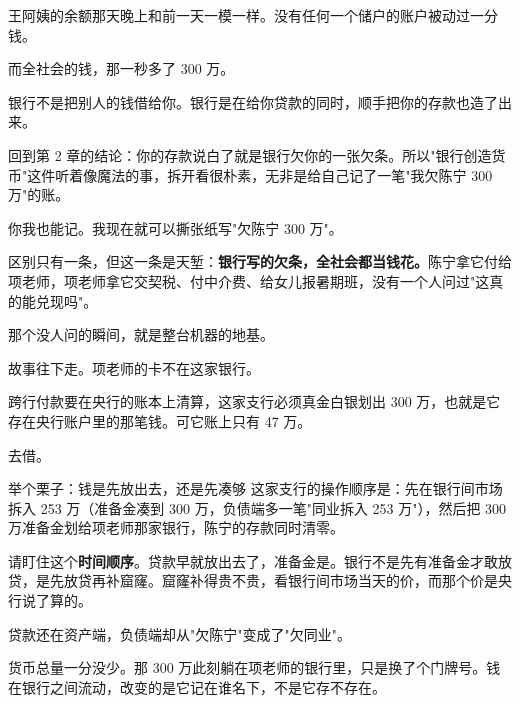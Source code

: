 王阿姨的余额那天晚上和前一天一模一样。没有任何一个储户的账户被动过一分钱。

而全社会的钱，那一秒多了 300 万。

\begin{pullquote}{}
银行不是把别人的钱借给你。银行是在给你贷款的同时，顺手把你的存款也造了出来。
\end{pullquote}

回到第 2 章的结论：你的存款说白了就是银行欠你的一张欠条。所以"银行创造货币"这件听着像魔法的事，拆开看很朴素，无非是给自己记了一笔"我欠陈宁 300 万"的账。

你我也能记。我现在就可以撕张纸写"欠陈宁 300 万"。

区别只有一条，但这一条是天堑：\textbf{银行写的欠条，全社会都当钱花。}陈宁拿它付给项老师，项老师拿它交契税、付中介费、给女儿报暑期班，没有一个人问过"这真的能兑现吗"。

那个没人问的瞬间，就是整台机器的地基。

故事往下走。项老师的卡不在这家银行。

跨行付款要在央行的账本上清算，这家支行必须真金白银划出 300 万，也就是它存在央行账户里的那笔钱。可它账上只有 47 万。

去借。

\begin{egbox}{举个栗子：钱是先放出去，还是先凑够}
这家支行的操作顺序是：先在银行间市场拆入 253 万（准备金凑到 300 万，负债端多一笔"同业拆入 253 万"），然后把 300 万准备金划给项老师那家银行，陈宁的存款同时清零。

请盯住这个\textbf{时间顺序}。贷款早就放出去了，准备金是。银行不是先有准备金才敢放贷，是先放贷再补窟窿。窟窿补得贵不贵，看银行间市场当天的价，而那个价是央行说了算的。

\end{egbox}

\begin{bsheet}
\end{bsheet}

贷款还在资产端，负债端却从"欠陈宁"变成了"欠同业"。

货币总量一分没少。那 300 万此刻躺在项老师的银行里，只是换了个门牌号。钱在银行之间流动，改变的是它记在谁名下，不是它存不存在。

